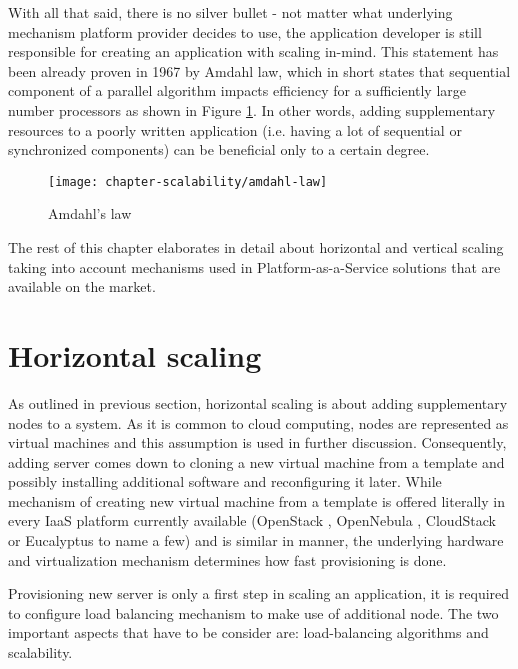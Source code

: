 With all that said, there is no silver bullet - not matter what underlying mechanism platform provider decides to use, the application developer is still responsible for creating an application with scaling in-mind. This statement has been already proven in 1967 by Amdahl law, which in short states that sequential component of a parallel algorithm impacts efficiency for a sufficiently large number processors \cite{Am67} as shown in Figure \ref{fig:amdahl-law}. In other words, adding supplementary resources to a poorly written application (i.e. having a lot of sequential or synchronized components) can be beneficial only to a certain degree. 

\begin{figure}[!ht]
  \begin{center}
    \texttt{[image: chapter-scalability/amdahl-law]}
  \end{center}
  \caption{Amdahl's law}
  \label{fig:amdahl-law}
\end{figure}



The rest of this chapter elaborates in detail about horizontal and vertical scaling taking into account mechanisms used in Platform-as-a-Service solutions that are available on the market.

\section{Horizontal scaling}
As outlined in previous section, horizontal scaling is about adding supplementary nodes to a system. As it is common to cloud computing, nodes are represented as virtual machines and this assumption is used in further discussion. Consequently, adding server comes down to cloning a new virtual machine from a template and possibly installing additional software and reconfiguring it later. While mechanism of creating new virtual machine from a template is offered literally in every IaaS platform currently available (OpenStack \cite{OpenStack}, OpenNebula \cite{OpenNebula}, CloudStack \cite{CloudStack} or Eucalyptus \cite{Eucalyptus} to name a few) and is similar in manner, the underlying hardware and virtualization mechanism determines how fast provisioning is done. 

Provisioning new server is only a first step in scaling an application, it is required to configure load balancing mechanism to make use of additional node. The two important aspects that have to be consider are: load-balancing algorithms and scalability.

